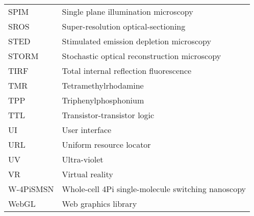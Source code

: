 \begin{flushleft}
\begin{longtable}[l]{|p{5.5em}|p{25em}|}
SPIM       & Single plane illumination microscopy                       \\
SROS       & Super-resolution optical-sectioning                        \\
STED       & Stimulated emission depletion microscopy                   \\
STORM      & Stochastic optical reconstruction microscopy               \\
TIRF       & Total internal reflection fluorescence                     \\
TMR        & Tetramethylrhodamine                                       \\
TPP        & Triphenylphosphonium                                       \\
TTL        & Transistor-transistor logic                                \\
UI         & User interface                                             \\
URL        & Uniform resource locator                                   \\
UV         & Ultra-violet                                               \\
VR         & Virtual reality                                            \\
W-4PiSMSN  & Whole-cell 4Pi single-molecule switching nanoscopy         \\
WebGL      & Web graphics library
\\
\hline
\end{longtable}


\end{flushleft}

